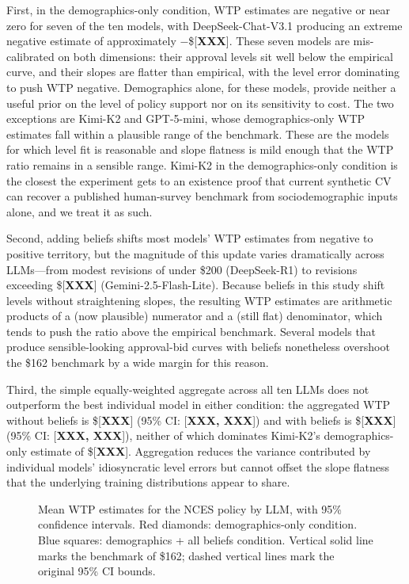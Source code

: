 \documentclass[12pt]{article}
\begin{document}
First, in the demographics-only condition, WTP estimates are negative or
near zero for seven of the ten models, with DeepSeek-Chat-V3.1 producing
an extreme negative estimate of approximately $-$\$[\textbf{XXX}]. These
seven models are mis-calibrated on both dimensions: their approval levels
sit well below the empirical curve, and their slopes are flatter than
empirical, with the level error dominating to push WTP negative.
Demographics alone, for these models, provide neither a useful prior on
the level of policy support nor on its sensitivity to cost. The two
exceptions are Kimi-K2 and GPT-5-mini, whose demographics-only WTP
estimates fall within a plausible range of the benchmark. These are the
models for which level fit is reasonable and slope flatness is mild
enough that the WTP ratio remains in a sensible range. Kimi-K2 in the
demographics-only condition is the closest the experiment gets to an
existence proof that current synthetic CV can recover a published
human-survey benchmark from sociodemographic inputs alone, and we treat
it as such.

Second, adding beliefs shifts most models' WTP estimates from negative
to positive territory, but the magnitude of this update varies
dramatically across LLMs---from modest revisions of under \$200
(DeepSeek-R1) to revisions exceeding \$[\textbf{XXX}]
(Gemini-2.5-Flash-Lite). Because beliefs in this study shift levels
without straightening slopes, the resulting WTP estimates are arithmetic
products of a (now plausible) numerator and a (still flat) denominator,
which tends to push the ratio above the empirical benchmark. Several
models that produce sensible-looking approval-bid curves with beliefs
nonetheless overshoot the \$162 benchmark by a wide margin for this
reason.

Third, the simple equally-weighted aggregate across all ten LLMs does
not outperform the best individual model in either condition: the
aggregated WTP without beliefs is \$[\textbf{XXX}] (95\% CI:
[\textbf{XXX, XXX}]) and with beliefs is \$[\textbf{XXX}] (95\% CI:
[\textbf{XXX, XXX}]), neither of which dominates Kimi-K2's
demographics-only estimate of \$[\textbf{XXX}]. Aggregation reduces
the variance contributed by individual models' idiosyncratic level
errors but cannot offset the slope flatness that the underlying training
distributions appear to share.

\begin{figure}[h]
    \centering
    \caption{Mean WTP estimates for the NCES policy by LLM, with 95\%
    confidence intervals. Red diamonds: demographics-only condition.
    Blue squares: demographics + all beliefs condition. Vertical solid
    line marks the \textcite{Aldy2012} benchmark of \$162; dashed
    vertical lines mark the original 95\% CI bounds.}
    \label{fig:nces-wtp}
\end{figure}
\end{document}
